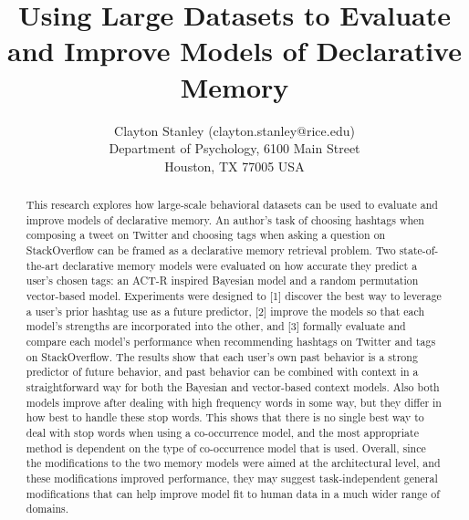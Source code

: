 \documentclass[english]{article}
\title{Using Large Datasets to Evaluate and Improve Models of Declarative Memory}
\author{Clayton Stanley (clayton.stanley@rice.edu) \\
  Department of Psychology, 6100 Main Street \\
  Houston, TX 77005 USA 
}
\begin{document}
\maketitle

\begin{abstract}
  This research explores how large-scale behavioral datasets can be used to evaluate and improve models of declarative memory.
  An author's task of choosing hashtags when composing a tweet on Twitter and choosing tags when asking a question on StackOverflow can be framed as a declarative memory retrieval problem.
  Two state-of-the-art declarative memory models were evaluated on how accurate they predict a user's chosen tags: an ACT-R inspired Bayesian model and a random permutation vector-based model.
  Experiments were designed to
  [1] discover the best way to leverage a user's prior hashtag use as a future predictor,
  [2] improve the models so that each model's strengths are incorporated into the other,
  and [3] formally evaluate and compare each model's performance when recommending hashtags on Twitter and tags on StackOverflow.
  The results show that each user's own past behavior is a strong predictor of future behavior, and past behavior can be combined with context in a straightforward way for both the Bayesian and vector-based context models.
  Also both models improve after dealing with high frequency words in some way, but they differ in how best to handle these stop words.
  This shows that there is no single best way to deal with stop words when using a co-occurrence model, and the most appropriate method is dependent on the type of co-occurrence model that is used.
  Overall, since the modifications to the two memory models were aimed at the architectural level, and these modifications improved performance,
  they may suggest task-independent general modifications that can help improve model fit to human data in a much wider range of domains.
\end{abstract}
\end{document}
